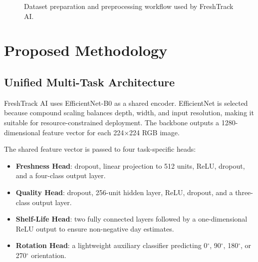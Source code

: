 \documentclass[conference]{IEEEtran}
\begin{document}
\begin{figure}[t]
\centering
{}
\caption{Dataset preparation and preprocessing workflow used by FreshTrack AI.}
\label{fig:data_pipeline}
\end{figure}

\section{Proposed Methodology}
\subsection{Unified Multi-Task Architecture}
FreshTrack AI uses EfficientNet-B0 as a shared encoder. EfficientNet is selected because compound scaling balances depth, width, and input resolution, making it suitable for resource-constrained deployment. The backbone outputs a 1280-dimensional feature vector for each 224$\times$224 RGB image.

The shared feature vector is passed to four task-specific heads:
\begin{itemize}
    \item \textbf{Freshness Head}: dropout, linear projection to 512 units, ReLU, dropout, and a four-class output layer.
    \item \textbf{Quality Head}: dropout, 256-unit hidden layer, ReLU, dropout, and a three-class output layer.
    \item \textbf{Shelf-Life Head}: two fully connected layers followed by a one-dimensional ReLU output to ensure non-negative day estimates.
    \item \textbf{Rotation Head}: a lightweight auxiliary classifier predicting 0$^{\circ}$, 90$^{\circ}$, 180$^{\circ}$, or 270$^{\circ}$ orientation.
\end{itemize}
\end{document}
